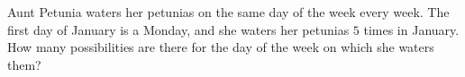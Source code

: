 Aunt Petunia waters her petunias on the same day of the week every week. The first day of January is a Monday, and she waters her petunias $5$ times in January. How many possibilities are there for the day of the week on which she waters them?
